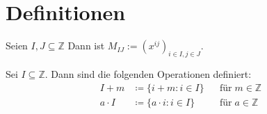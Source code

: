 \section{Definitionen}

\begin{definition}
    Seien $I, J \subseteq \mathbb{Z}$ Dann ist $M_{IJ} := (x^{ij})_{i \in I, j \in J}$. 
\end{definition}

\begin{definition}
    Sei $I \subseteq \mathbb{Z}$. Dann sind die folgenden Operationen definiert:
    \begin{align*}
        I + m       &\coloneq \{i + m: i \in I\}               && \text{für} \; m \in \mathbb{Z} \\
        a \cdot I   &\coloneq \{a \cdot i: i \in I\}    && \text{für} \; a \in \mathbb{Z}
    \end{align*}
\end{definition}